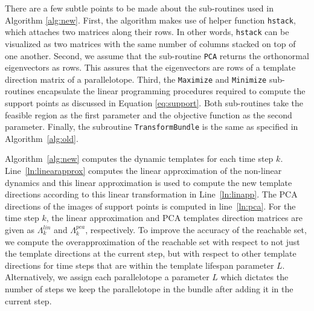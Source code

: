 There are a few subtle points to be made about the sub-routines used in Algorithm \ref{alg:new}.
%
First, the algorithm makes use of helper function \texttt{hstack}, which attaches two matrices along their rows. In other words, \texttt{hstack} can be visualized as two matrices with the same number of columns stacked on top of one another.
%
Second, we assume that the sub-routine  \texttt{PCA} returns the orthonormal eigenvectors as rows. This assures that the eigenvectors are rows of a template direction matrix of a parallelotope.
%
Third, the \texttt{Maximize} and \texttt{Minimize} sub-routines encapsulate the linear programming procedures required to compute the support points as discussed in Equation \ref{eq:support}.
%
Both sub-routines take the feasible region as the first parameter and the objective function as the second parameter.
%
 Finally, the subroutine \texttt{TransformBundle} is the same as specified in Algorithm~\ref{alg:old}.



Algorithm~\ref{alg:new} computes the dynamic templates for each time step $k$.
%
Line~\ref{ln:linearapprox} computes the linear approximation of the non-linear dynamics and this linear approximation is used to compute the new template directions according to this linear transformation in Line~\ref{ln:linapp}.
%
The PCA directions of the images of support points is computed in line~\ref{ln:pca}.
%
For the time step $k$, the linear approximation and PCA templates direction matrices are given as $\Lambda_{k}^{lin}$ and $\Lambda_{k}^{pca}$, respectively.
%
To improve the accuracy of the reachable set, we compute the overapproximation of the reachable set with respect to not just the template directions at the current step, but with respect to other template directions for time steps that are within the template lifespan parameter $L$.
%
Alternatively, we assign each parallelotope a parameter $L$ which dictates the number of steps we keep the parallelotope in the bundle after adding it in the current step.
